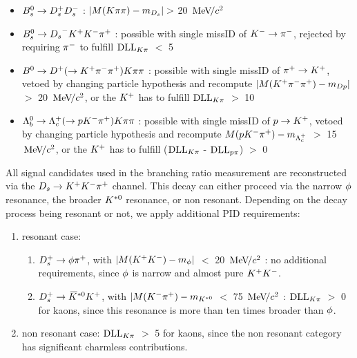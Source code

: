 \begin{itemize}

\item $\Bs\to\Dsp\Dsm$ : $|M(\kaon\pion\pion) - m_{\Ds}| >$ 20 $\mevcc$ 

\item $\Bs\to\Ds^{-}\Kp\Km\pip$ : possible with single missID of $\Km\rightarrow\pim$, rejected by requiring $\pim$ to fulfill $\dllkpi$ $<$ 5 

\item $\Bz\to\Dp(\to\Kp\pim\pip)\kaon\pion\pion$ : possible with single missID of $\pip\rightarrow\Kp$, vetoed by changing particle hypothesis and recompute $|M(\Kp\pim\pip) - m_{Dp}|$ $>$ 20 $\mevcc$, 
or the $\Kp$ has to fulfill $\dllkpi$ $>$ 10

\item $\Lb\to\Lc(\to\proton\Km\pip)\kaon\pion\pion$ : possible with single missID of $\proton\rightarrow\Kp$, vetoed by changing particle hypothesis and recompute $M(\proton\Km\pip) - m_{\Lc}$ $>$ 15 $\mevcc$, 
or the $\Kp$ has to fulfill ($\dllkpi$ - $\dllppi$) $>$ 0  

\end{itemize} 


All signal candidates used in the branching ratio measurement are reconstructed via the $\Ds\to\Kp\Km\pip$ channel. This decay can either proceed via the narrow $\phiz$ resonance, the broader $\Kstarz$ resonance, or non resonant.
Depending on the decay process being resonant or not, we apply additional PID requirements:

\begin{enumerate}

\item resonant case: 
\begin{enumerate}
\item $\Dsp\to\phiz\pip$, with $|M(\Kp\Km) - m_{\phiz}|$ $<$ 20 $\mevcc$ : no additional requirements, since $\phiz$ is narrow and almost pure $\Kp\Km$. 
\item $\Dsp\to\Kstarzb\Kp$, with  $|M(\Km\pip) -m_{\Kstarz}$ $<$ 75 $\mevcc$ :  $\dllkpi$ $>$ 0 for kaons, since this resonance is more than ten times broader than $\phiz$. 
\end{enumerate}

\item non resonant case: $\dllkpi$ $>$ 5 for kaons, since the non resonant category has significant charmless contributions.

\end{enumerate}

